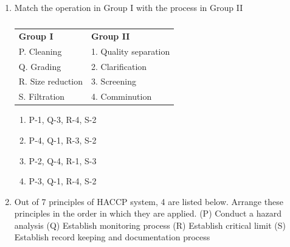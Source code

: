 \documentclass[a4paper,10pt]{article}
\begin{document}
\begin{enumerate}
    \item Match the operation in Group I with the process in Group II
    \begin{table}[h!] \centering \caption*{} \label{tab:q14_food_2018}
        \begin{tabular}{ll}
            \textbf{Group I} & \textbf{Group II} \\
            P. Cleaning & 1. Quality separation \\
            Q. Grading & 2. Clarification \\
            R. Size reduction & 3. Screening \\
            S. Filtration & 4. Comminution
        \end{tabular}
    \end{table}
    \hfill{}
    \begin{enumerate}[label=\Alph*)]
        \item P-1, Q-3, R-4, S-2
        \item P-4, Q-1, R-3, S-2
        \item P-2, Q-4, R-1, S-3
        \item P-3, Q-1, R-4, S-2
    \end{enumerate}

    \item Out of 7 principles of HACCP system, 4 are listed below. Arrange these principles in the order in which they are applied.
    (P) Conduct a hazard analysis
    (Q) Establish monitoring process
    (R) Establish critical limit
    (S) Establish record keeping and documentation process
    \hfill{}
    \begin{enumerate}[label=\Alph*)]
    \end{enumerate}


\end{enumerate}
\end{document}
